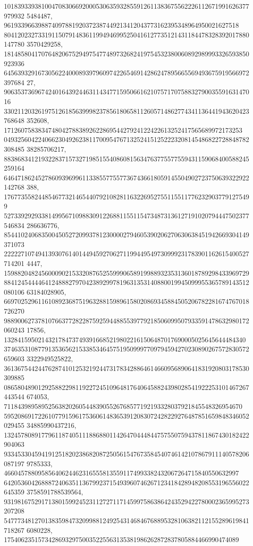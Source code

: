 \documentclass[12pt]{article}
\begin{document}
101839339381004708306692000530635932855912611383675562226112671991626377979932
5484487, 961933966398874097881920372387449213412043773162395348964950021627518
804120232733191150791483611994946995250416127735121431184478328392017880147780
3570429258, 
181485804170764820675294975477489732682419754532380060892989993326593850923936
645639329167305622400089397960974226546914286247895665569493675919566972397684
27, 90635373696742401643924463114347715950661621075717075883279003559163147016
330211203261975126185639998237856180658112605714862774341136441943620423768648
352608, 1712607583834748042788389262286954427924122422613252417565689972173253
049325604224066230492623811700954767132524151252223208145486822728848782308485
38285706217, 
883868341219322837157327198515540860815634763775577559431159068400588245259164
646471862452786093969961133855775577367436618059145504902723750639322922142768
388, 1767735582448546773214654407921082811632269527551155117762329037791275499
527339292933814995671098830912268811551154734873136127191020794447502377546834
286636776, 
854410240683500450527209937812300002794605390206270630638451942669304149371073
222227107494139307614014494592706271199449549730999231783901162615400527714201
4447, 159882048245600090215332087652559990658919988932353136018789298433969729
884124544446412488827970423892997819631353140880019945099955365789143512080106
63184028905, 
669702529611610892368751963288159896158020869345884505206782281674767018726270
988900627378107663772822875925944885539779218506099507933591478632980172060243
17856, 13284159502143217847374939166852198022161506487017690005025645644484340
374635310877913536562153385346457519509997709794594270230890267572830572659603
3322949525822, 
361367544244762874101253219244731783428864614660956890641831920803178530309885
086580489012925882298119227245109648176406458824398028541922253101467267443544
674053, 7118439895895256382026054483905526768577192193328037921845548326954670
595208691722610779159617536061483653912083072428229276487851659848346052029455
34885990437216, 
132457808917796118740511188688011426470444844757550759437811867430182422904063
933453304594191251820238682087250561547673584540746142107867911140578206087197
9785333, 466045788095856406244623165558135591174993382432067264715840550632997
642053604268887240635113679923715493960746267123418428948208553196556022645359
3758591788539564, 
931981675291713801599245231127271171459975863864243529422780002365995273207208
547773481270138359847320998812492543146846768895328106382112155289619841718267
6080228, 175406235157342869329750035225563135381986262872837805884466990474089
\end{document}
